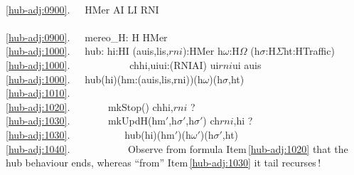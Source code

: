 {%
\bp
{}\\
\ref{hub-adj:0900}.\ \ \ HMer {\EQ} AI {\TIMES} LI {\TIMES} RNI\\
\\
\ref{hub-adj:0900}.\ \ \ mereo\_H: H {\RIGHTARROW} HMer\\
\ref{hub-adj:1000}.\ \ \ hub: hi:HI {\RIGHTARROW} (auis,lis,$rni$):HMer {\RIGHTARROW} h$\omega$:H$\Omega$ {\RIGHTARROW} (h$\sigma$:H$\Sigma${\TIMES}ht:HTraffic) {\RIGHTARROW}\\
\ref{hub-adj:1000}.\ \ \ \ \ \ \ \ \ \ \ \ {\LBRACE}ch{\LBRACKET}hi,ui{\RBRACKET}{\BAR}ui:(RNI{\BAR}AI) {\RDOT} ui{\EQ}$rni${\VEE}ui {\ISIN} auis{\RBRACE}\ \ \\
\ref{hub-adj:1000}.\ \ \ hub(hi)(hm:(auis,lis,rni))(h$\omega$)(h$\sigma$,ht) {\IS}\\
\ref{hub-adj:1010}.\ \ \ \ \ \ \ \ \ \ \ {\DOTDOTDOT}\\
\ref{hub-adj:1020}.\ \ \ \ \ \ \ {\DETCHOICE}  mkStop() {\EQ} ch{\LBRACKET}hi,$rni${\RBRACKET} ?   \\
\ref{hub-adj:1030}.\ \ \ \ \ \ \ {\DETCHOICE}  mkUpdH(hm$'$,h$\sigma$$'$,h$\sigma$$'$) {\EQ} ch{\LBRACKET}{\LBRACE}$rni$,hi{\RBRACE}{\RBRACKET} ? \\
\ref{hub-adj:1030}.\ \ \ \ \ \ \ \ \ \ \ hub(hi)(hm$'$)(h$\omega$$'$)(h$\sigma$$'$,ht) \ \ \ \ \ \\
\ref{hub-adj:1040}.\ \ \ \ \ \ \ \ \ \ \ {\DOTDOTDOT} 
\ep
\noindent
\begynd
\pind Observe from formula Item\,\ref{hub-adj:1020} that the hub
      behaviour ends, 
\pind whereas ``from'' Item\,\ref{hub-adj:1030} it tail recurses\,! \dbsquare
\afslut
}



